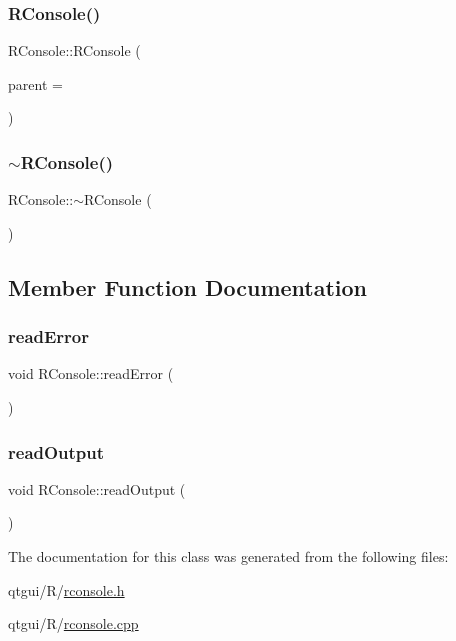 \subsubsection{\texorpdfstring{RConsole()}{RConsole()}}
{\footnotesize\ttfamily R\+Console\+::\+R\+Console (\begin{DoxyParamCaption}\item[{Q\+Widget $\ast$}]{parent = {} }\end{DoxyParamCaption})\hspace{0.3cm}{\ttfamily [explicit]}}

\mbox{\label{class_r_console_af331091d28001820742078cd760560ff}} 
\subsubsection{\texorpdfstring{$\sim$RConsole()}{~RConsole()}}
{\footnotesize\ttfamily R\+Console\+::$\sim$\+R\+Console (\begin{DoxyParamCaption}{ }\end{DoxyParamCaption})}



\subsection{Member Function Documentation}
\mbox{\label{class_r_console_a002edfbb44d2da8b971f01ccd0ff9994}} 
\subsubsection{\texorpdfstring{readError}{readError}}
{\footnotesize\ttfamily void R\+Console\+::read\+Error (\begin{DoxyParamCaption}{ }\end{DoxyParamCaption})\hspace{0.3cm}{\ttfamily [slot]}}

\mbox{\label{class_r_console_ad221772edf4f86270d4e0f43a300756c}} 
\subsubsection{\texorpdfstring{readOutput}{readOutput}}
{\footnotesize\ttfamily void R\+Console\+::read\+Output (\begin{DoxyParamCaption}{ }\end{DoxyParamCaption})\hspace{0.3cm}{\ttfamily [slot]}}



The documentation for this class was generated from the following files\+:\begin{DoxyCompactItemize}
\item 
qtgui/\+R/\mbox{\hyperlink{rconsole_8h}{rconsole.\+h}}\item 
qtgui/\+R/\mbox{\hyperlink{rconsole_8cpp}{rconsole.\+cpp}}\end{DoxyCompactItemize}
